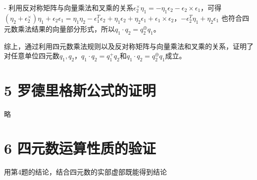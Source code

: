 \documentclass[12pt, a4paper, oneside]{ctexart}
\begin{document}
	- 利用反对称矩阵与向量乘法和叉乘的关系\(\epsilon_2^{\times}\eta_1=-\eta_1\epsilon_2 - \epsilon_2\times\epsilon_1\)，可得\((\eta_2+\epsilon_2^{\times})\eta_1+\epsilon_2\epsilon_1=\eta_1\eta_2-\epsilon_1^{T}\epsilon_2+\eta_1\epsilon_2+\eta_2\epsilon_1+\epsilon_1\times\epsilon_2\)，\(-\epsilon_2^{T}\eta_1+\eta_2\epsilon_1\) 也符合四元数乘法结果的向量部分形式，所以\(q_1\cdot q_2 = q_2^{\oplus}q_1\)。
	
	综上，通过利用四元数乘法规则以及反对称矩阵与向量乘法和叉乘的关系，证明了对任意单位四元数\(q_1,q_2\)，\(q_1\cdot q_2 = q_1^{+}q_2\)和\(q_1\cdot q_2 = q_2^{\oplus}q_1\)成立。
	
	\section{5 罗德里格斯公式的证明}
	
	略

	\section{6 四元数运算性质的验证}
	
	用第4题的结论，结合四元数的实部虚部既能得到结论
	
\end{document}

